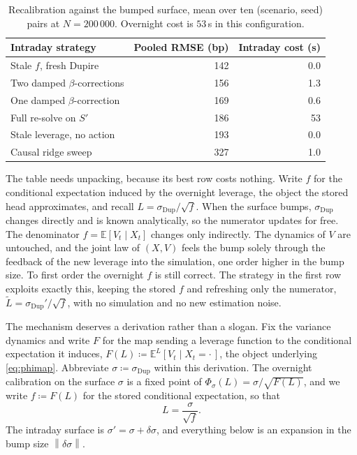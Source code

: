 \documentclass[11pt,a4paper]{article}
\theoremstyle{plain}
\theoremstyle{definition}
\theoremstyle{definition}
\newcommand{\E}{\mathbb{E}}
\newcommand{\norm}[1]{\left\lVert #1 \right\rVert}
\newcommand{\sigDup}{\sigma_{\mathrm{Dup}}}
\newcommand{\Lev}{L}
\newcommand{\Phimap}{\Phi}
\begin{document}
\begin{table}[h]
\centering
\begin{tabular}{lrr}
\toprule
Intraday strategy & Pooled RMSE (bp) & Intraday cost (s) \\
\midrule
Stale $f$, fresh Dupire & 142 & 0.0 \\
Two damped $\beta$-corrections & 156 & 1.3 \\
One damped $\beta$-correction & 169 & 0.6 \\
Full re-solve on $S'$ & 186 & 53 \\
Stale leverage, no action & 193 & 0.0 \\
Causal ridge sweep & 327 & 1.0 \\
\bottomrule
\end{tabular}
\caption{Recalibration against the bumped surface, mean over ten (scenario, seed) pairs at $N = 200\,000$. Overnight cost is $53$\,s in this configuration.}
\label{tab:warm}
\end{table}

The table needs unpacking, because its best row costs nothing. Write $f$ for the conditional expectation induced by the overnight leverage, the object the stored head approximates, and recall $\Lev = \sigDup/\sqrt{f}$. When the surface bumps, $\sigDup$ changes directly and is known analytically, so the numerator updates for free. The denominator $f = \E[V_t \mid X_t]$ changes only indirectly. The dynamics of $V$ are untouched, and the joint law of $(X, V)$ feels the bump solely through the feedback of the new leverage into the simulation, one order higher in the bump size. To first order the overnight $f$ is still correct. The strategy in the first row exploits exactly this, keeping the stored $f$ and refreshing only the numerator, $\widetilde{\Lev} = \sigDup'/\sqrt{f}$, with no simulation and no new estimation noise.

The mechanism deserves a derivation rather than a slogan. Fix the variance dynamics and write $F$ for the map sending a leverage function to the conditional expectation it induces, $F(\Lev) \coloneqq \E^{\Lev}[V_t \mid X_t = \cdot\,]$, the object underlying \cref{eq:phimap}. Abbreviate $\sigma \coloneqq \sigDup$ within this derivation. The overnight calibration on the surface $\sigma$ is a fixed point of $\Phimap_\sigma(\Lev) = \sigma/\sqrt{F(\Lev)}$, and we write $f \coloneqq F(\Lev)$ for the stored conditional expectation, so that
\[
  \Lev = \frac{\sigma}{\sqrt{f}} .
\]
The intraday surface is $\sigma' = \sigma + \delta\sigma$, and everything below is an expansion in the bump size $\norm{\delta\sigma}$.
\end{document}

